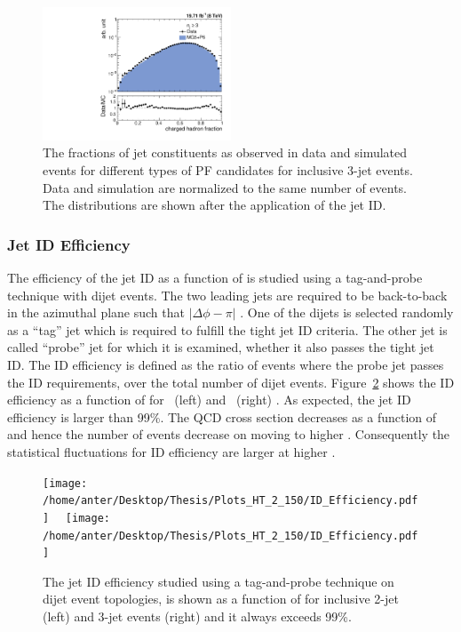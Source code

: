 \begin{figure}[!htbp]
\begin{center}
 \includegraphics[width=0.5\textwidth]{Plots_HT_2_150/Comparison_ChHadFrac_3_HT_2_150.pdf}%
 \caption{The fractions of jet constituents as observed in data and simulated events for different types of PF candidates for inclusive 3-jet events. Data and simulation are normalized to the same number of events. The distributions are shown after the application of the jet ID.}
 \label{fig:qual3}
 \end{center}
\end{figure} 

\subsubsection{Jet ID Efficiency}
The efficiency of the jet ID as a function of \httwo is studied using a tag-and-probe technique with dijet events. The two leading jets are required to be back-to-back in the azimuthal plane such that $|\Delta\phi - \pi|$ . One of the dijets is selected randomly as a ``tag'' jet which is required to fulfill the tight jet ID criteria. The other jet is called ``probe'' jet for which it is examined, whether it also passes the tight jet ID. The ID efficiency is defined as the ratio of events where the probe jet passes the ID requirements, over the total number of dijet events. Figure~\ref{fig:ideff} shows the ID efficiency as a function of \httwo for \njt~(left) and \njth~(right) \qm. As expected, the jet ID efficiency is larger than 99\%. The QCD cross section decreases as a function of \httwo and hence the number of events decrease on moving to higher \httwons. Consequently the statistical fluctuations for ID efficiency are larger at higher \httwons.

\begin{figure}[!htbp]
 \begin{center}
 \texttt{[image: /home/anter/Desktop/Thesis/Plots\_HT\_2\_150/ID\_Efficiency.pdf]}%
 ~~\texttt{[image: /home/anter/Desktop/Thesis/Plots\_HT\_2\_150/ID\_Efficiency.pdf]}%
 \caption{The jet ID efficiency studied using a tag-and-probe technique on dijet event topologies, is shown as a function of \httwo for inclusive 2-jet (left) and 3-jet events (right) and it always exceeds 99\%.}
 \label{fig:ideff}
 \end{center}
\end{figure} 

